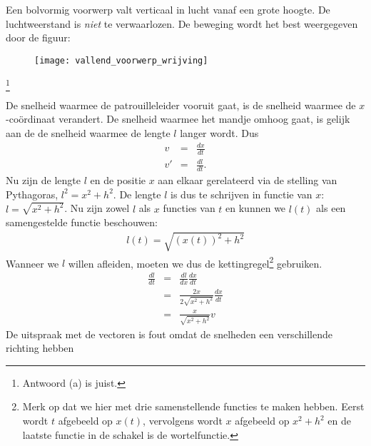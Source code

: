\begin{exercise} Een bolvormig voorwerp valt verticaal in lucht vanaf een grote
hoogte. De luchtweerstand is \textit{niet} te verwaarlozen. De
beweging wordt het best weergegeven door de figuur:
\begin{figure}[h]
\begin{center}
\texttt{[image: vallend\_voorwerp\_wrijving]}
\end{center}
\end{figure}
\footnote{Antwoord (a) is juist.}

\begin{oplossing}
\item De snelheid waarmee de patrouilleleider vooruit gaat, is de snelheid waarmee de $x$-co\"ordinaat verandert. De snelheid waarmee het mandje omhoog gaat, is gelijk aan de de snelheid waarmee de lengte $l$ langer wordt. Dus
\begin{eqnarray*}
v&=&\frac{dx}{dt}\\
v'&=&\frac{dl}{dt}.
\end{eqnarray*}
Nu zijn de lengte $l$ en de positie $x$ aan elkaar gerelateerd via de stelling van Pythagoras, $l^2=x^2+h^2$. De lengte $l$ is dus te schrijven in functie van $x$: $l=\sqrt{x^2+h^2}$. Nu zijn zowel $l$ als $x$ functies van $t$ en kunnen we $l(t)$ als een samengestelde functie beschouwen:
\begin{eqnarray*}
l(t)=\sqrt{\left(x(t)\right)^2+h^2}
\end{eqnarray*}
Wanneer we $l$ willen afleiden, moeten we dus de kettingregel\footnote{Merk op dat we hier met drie samenstellende functies te maken hebben. Eerst wordt $t$ afgebeeld op $x(t)$, vervolgens wordt $x$ afgebeeld op $x^2+h^2$ en de laatste functie in de schakel is de wortelfunctie.} gebruiken.
\begin{eqnarray*}
\frac{dl}{dt}&=&\frac{dl}{dx}\frac{dx}{dt}\\
&=&\frac{2x}{2\sqrt{x^2+h^2}}\frac{dx}{dt}\\
&=&\frac{x}{\sqrt{x^2+h^2}}v
\end{eqnarray*}
De uitspraak met de vectoren is fout omdat de snelheden een verschillende richting hebben
\end{oplossing}

\end{exercise}
















